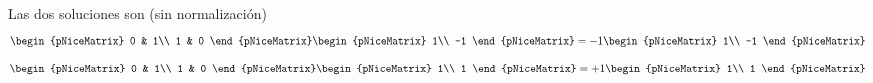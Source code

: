 Las dos soluciones son (sin normalización)
\[
  \begin{pNiceMatrix}
    0 & 1\\
    1 & 0
  \end{pNiceMatrix}
  \begin{pNiceMatrix}
    1\\
    -1
  \end{pNiceMatrix}
  = -1
  \begin{pNiceMatrix}
    1\\
    -1
  \end{pNiceMatrix}
\]
\[
  \begin{pNiceMatrix}
    0 & 1\\
    1 & 0
  \end{pNiceMatrix}
  \begin{pNiceMatrix}
    1\\
    1
  \end{pNiceMatrix}
  = +1
  \begin{pNiceMatrix}
    1\\
    1
  \end{pNiceMatrix}
\]

